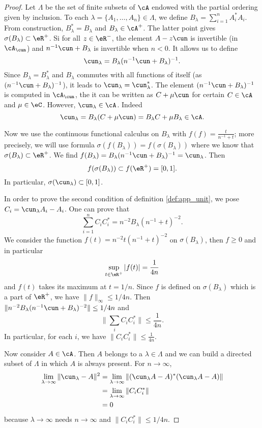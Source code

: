 \begin{proof}
Let $\Lambda$ be the set of finite subsets of $\cA$ endowed with the partial ordering given by inclusion. To each $\lambda=\{ A_1,\ldots,A_n \}\in\Lambda$, we define $B_{\lambda}=\sum_{i=1}^nA_i^*A_i$. From construction, $B_{\lambda}^*=B_{\lambda}$ and $B_{\lambda}\in\cA^+$. The latter point gives $\sigma(B_{\lambda})\subset\eR^+$. Si for all $z\in\eR^-$, the element $A-z\cun$ is invertible (in $\cA_{\cun}$) and $n^{-1}\cun+B_{\lambda}$ is invertible when $n<0$. It allows us to define 
\[ 
  \cun_{\lambda}=B_{\lambda}(n^{-1}\cun+B_{\lambda})^{-1}.
\]
Since $B_{\lambda}=B_{\lambda}^*$ and $B_{\lambda}$ commutes with all functions of itself (as $(n^{-1}\cun+B_{\lambda})^{-1}$), it leads to $\cun_{\lambda}=\cun_{\lambda}^*$. The element $(n^{-1}\cun+B_{\lambda})^{-1}$ is computed in $\cA_{\cun}$, the it can be written as $C+\mu\cun$ for certain $C\in\cA$ and $\mu\in\eC$. However, $\cun_{\lambda}\in\cA$. Indeed
\[ 
  \cun_{\lambda}=B_{\lambda}(C+\mu\cun)=B_{\lambda}C+\mu B_{\lambda}\in\cA.
\]

Now we use the continuous functional calculus on $B_{\lambda}$ with $f(f)=\frac{t}{n^{-1}+t}$; more precisely, we will use formula $\sigma(f(B_{\lambda}))=f(\sigma(B_{\lambda}))$ where we know that $\sigma(B_{\lambda})\subset\eR^+$. We find $f(B_{\lambda})=B_{\lambda}(n^{-1}\cun+B_{\lambda})^{-1}=\cun_{\lambda}$. Then
\[ 
  f(\sigma(B_{\lambda}))\subset f(\eR^+)=[0,1].
\]
In particular, $\sigma(\cun_{\lambda})\subset[0,1]$. 

In order to prove the second condition of definition \ref{def:app_unit}, we pose $C_i=\cun_{\lambda} A_i-A_i$. One can prove that 
\[ 
  \sum_{i=1}^n C_iC_i^*=n^{-2}B_{\lambda}(n^{-1}+t)^{-2}.
\]
 We consider the function $f(t)=n^{-2}t(n^{-1}+t)^{-2}$ on $\sigma(B_{\lambda})$, then $f\geq 0$ and in particular
\[ 
  \sup_{t\in\eR^+}| f(t) |=\frac{1}{4n}
\]
and $f(t)$ takes its maximum at $t=1/n$. Since $f$ is defined on $\sigma(B_{\lambda})$ which is a part of $\eR^+$, we have $\| f \|_{\infty}\leq 1/4n$. Then $\| n^{-2}B_{\lambda}(n^{-1}\cun+B_{\lambda})^{-2} \|\leq 1/4n$ and
\[ 
  \| \sum_i C_iC_i^* \|\leq\frac{1}{4n}.
\]
In particular, for each $i$, we have $\| C_iC_i^* \|\leq \frac{1}{4n}$.

Now consider $A\in\cA$. Then $A$ belongs to a $\lambda\in\Lambda$ and we can build a directed subset of $\Lambda$ in which $A$ is always present. For $n\to\infty$,
\begin{equation}
\begin{split}
  \lim_{\lambda\to\infty}\| \cun_{\lambda}-A \|^2&=\lim_{\lambda\to\infty}\| (\cun_{\lambda}A-A)^*(\cun_{\lambda}A-A) \|\\
                                                &=\lim_{\lambda\to\infty}\| C_iC_i^* \|\\
                                                &=0 
\end{split}
\end{equation}
because $\lambda\to\infty$ needs $n\to\infty$ and $\| C_iC_i^* \|\leq 1/4n$.


\end{proof}
